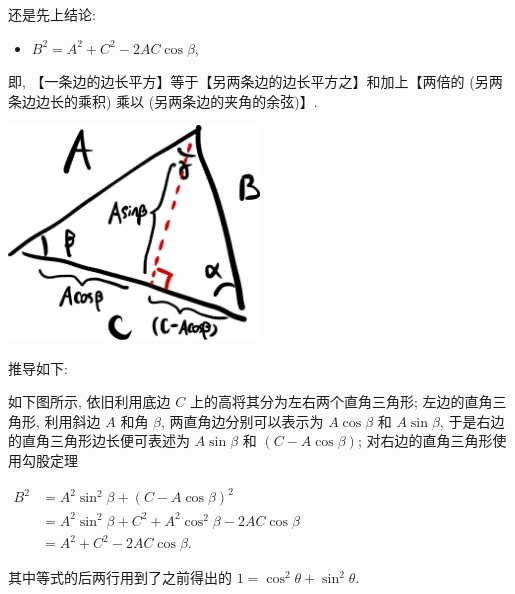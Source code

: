 \begin{tcolorbox}[size=fbox, breakable, enhanced jigsaw, title={余弦定律 (law of cosine)}]

还是先上结论:

\begin{itemize}

\item
  $\boxed{B^2=A^2+C^2-2AC\cos\beta}$,
\end{itemize}

即, 【一条边的边长平方】等于【另两条边的边长平方之】和加上【两倍的
(另两条边边长的乘积) 乘以 (另两条边的夹角的余弦)】.

\begin{tcolorbox}[size=fbox, breakable, enhanced jigsaw]
\includegraphics[width=0.5\textwidth]{img/image-20230308151417631.png}
\end{tcolorbox}

推导如下:

如下图所示, 依旧利用底边 $C$ 上的高将其分为左右两个直角三角形;
左边的直角三角形, 利用斜边 $A$ 和角 $\beta$, 两直角边分别可以表示为
$A\cos\beta$ 和 $A\sin\beta$, 于是右边的直角三角形边长便可表述为
$A\sin\beta$ 和 $(C-A\cos\beta)$; 对右边的直角三角形使用勾股定理

$\begin{aligned}B^2&=A^2\sin^2\beta+(C-A\cos\beta)^2\\ &=A^2\sin^2\beta+C^2+A^2\cos^2\beta-2AC\cos\beta\\ &=A^2+C^2-2AC\cos\beta.\end{aligned}$

其中等式的后两行用到了之前得出的 $1=\cos^2\theta+\sin^2\theta$.

\end{tcolorbox}


